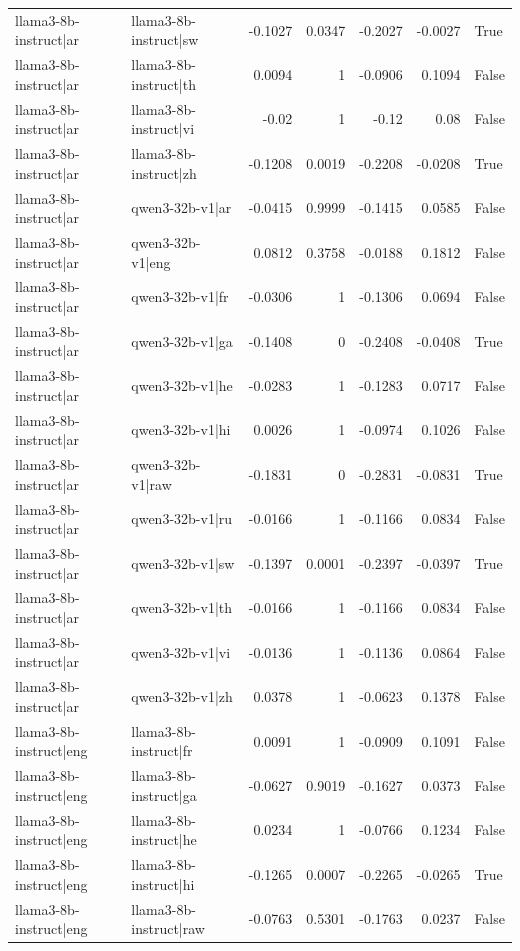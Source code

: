 \begin{table}
\begin{tabular}{l l r r r r l}
llama3-8b-instruct|ar & llama3-8b-instruct|sw & -0.1027 & 0.0347 & -0.2027 & -0.0027 & True \\
llama3-8b-instruct|ar & llama3-8b-instruct|th & 0.0094 & 1 & -0.0906 & 0.1094 & False \\
llama3-8b-instruct|ar & llama3-8b-instruct|vi & -0.02 & 1 & -0.12 & 0.08 & False \\
llama3-8b-instruct|ar & llama3-8b-instruct|zh & -0.1208 & 0.0019 & -0.2208 & -0.0208 & True \\
llama3-8b-instruct|ar & qwen3-32b-v1|ar & -0.0415 & 0.9999 & -0.1415 & 0.0585 & False \\
llama3-8b-instruct|ar & qwen3-32b-v1|eng & 0.0812 & 0.3758 & -0.0188 & 0.1812 & False \\
llama3-8b-instruct|ar & qwen3-32b-v1|fr & -0.0306 & 1 & -0.1306 & 0.0694 & False \\
llama3-8b-instruct|ar & qwen3-32b-v1|ga & -0.1408 & 0 & -0.2408 & -0.0408 & True \\
llama3-8b-instruct|ar & qwen3-32b-v1|he & -0.0283 & 1 & -0.1283 & 0.0717 & False \\
llama3-8b-instruct|ar & qwen3-32b-v1|hi & 0.0026 & 1 & -0.0974 & 0.1026 & False \\
llama3-8b-instruct|ar & qwen3-32b-v1|raw & -0.1831 & 0 & -0.2831 & -0.0831 & True \\
llama3-8b-instruct|ar & qwen3-32b-v1|ru & -0.0166 & 1 & -0.1166 & 0.0834 & False \\
llama3-8b-instruct|ar & qwen3-32b-v1|sw & -0.1397 & 0.0001 & -0.2397 & -0.0397 & True \\
llama3-8b-instruct|ar & qwen3-32b-v1|th & -0.0166 & 1 & -0.1166 & 0.0834 & False \\
llama3-8b-instruct|ar & qwen3-32b-v1|vi & -0.0136 & 1 & -0.1136 & 0.0864 & False \\
llama3-8b-instruct|ar & qwen3-32b-v1|zh & 0.0378 & 1 & -0.0623 & 0.1378 & False \\
llama3-8b-instruct|eng & llama3-8b-instruct|fr & 0.0091 & 1 & -0.0909 & 0.1091 & False \\
llama3-8b-instruct|eng & llama3-8b-instruct|ga & -0.0627 & 0.9019 & -0.1627 & 0.0373 & False \\
llama3-8b-instruct|eng & llama3-8b-instruct|he & 0.0234 & 1 & -0.0766 & 0.1234 & False \\
llama3-8b-instruct|eng & llama3-8b-instruct|hi & -0.1265 & 0.0007 & -0.2265 & -0.0265 & True \\
llama3-8b-instruct|eng & llama3-8b-instruct|raw & -0.0763 & 0.5301 & -0.1763 & 0.0237 & False \\

\end{tabular}
\end{table}
